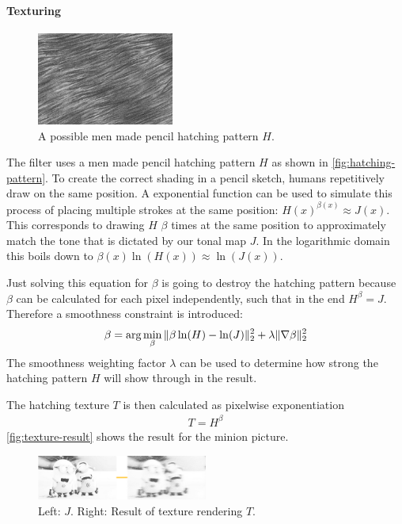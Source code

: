 \paragraph{Texturing}
\begin{figure}[htb]
  \centering
  \includegraphics[width=0.4\textwidth]{images/texture2.jpg}
  \caption{A possible men made pencil hatching pattern $H$.}
  \label{fig:hatching-pattern}
\end{figure}
The filter uses a men made pencil hatching pattern $H$ as shown in
\autoref{fig:hatching-pattern}. To create the correct shading in a pencil
sketch, humans repetitively draw on the same position. A exponential function
can be used to simulate this process of placing multiple strokes at the same
position: $H(x)^{\beta(x)} \approx J(x)$. This corresponds to drawing $H$
$\beta$ times at the same position to approximately match the tone that is
dictated by our tonal map $J$. In the logarithmic domain this boils down to
$\beta(x) \ln\left( H(x) \right) \approx \ln\left( J(x) \right)$.



Just solving this equation for $\beta$ is going to destroy the hatching
pattern because $\beta$ can be calculated for each pixel independently, such
that in the end $H^{\beta} = J$. Therefore a smoothness constraint is
introduced:
\begin{align}
  \beta = \arg \min_{\beta}\|\beta\ln(H) - \ln(J)\|_2^2 + \lambda
  \|\nabla \beta\|_2^2
  \label{eq:beta}
\end{align}
The smoothness weighting factor $\lambda$ can be used to determine how strong
the hatching pattern $H$ will show through in the result.

The hatching texture $T$ is then calculated as pixelwise exponentiation
\begin{align*}
  T = H^{\beta}
\end{align*}
\autoref{fig:texture-result} shows the result for the minion picture.

\begin{figure}[htb]
  \centering
  \includegraphics[width=0.5\textwidth]{images/texture-result.png}
  \caption{Left: $J$. Right: Result of texture rendering $T$.}
  \label{fig:texture-result}
\end{figure}



